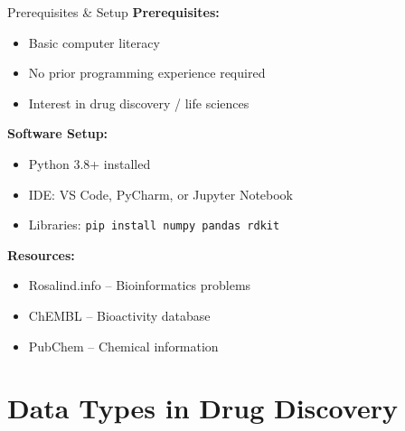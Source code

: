 \documentclass{beamer}
\begin{document}
\begin{frame}{Prerequisites \& Setup}
    \small
    \textbf{Prerequisites:}
    \begin{itemize}
        \item Basic computer literacy
        \item No prior programming experience required
        \item Interest in drug discovery / life sciences
    \end{itemize}
    \vspace{0.5em}
    \textbf{Software Setup:}
    \begin{itemize}
        \item Python 3.8+ installed
        \item IDE: VS Code, PyCharm, or Jupyter Notebook
        \item Libraries: \texttt{pip install numpy pandas rdkit}
    \end{itemize}
    \vspace{0.5em}
    \textbf{Resources:}
    \begin{itemize}
        \item Rosalind.info -- Bioinformatics problems
        \item ChEMBL -- Bioactivity database
        \item PubChem -- Chemical information
    \end{itemize}
\end{frame}

\section{Data Types in Drug Discovery}
\end{document}
